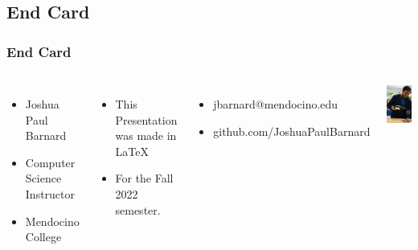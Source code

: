 \documentclass{beamer}
\begin{document}
		\subsection{End Card}
	\begin{frame}
		\frametitle{End Card}	
		\begin{columns}
			\vspace{-25pt}
			\begin{itemize}
				\item Joshua Paul Barnard
				\item Computer Science Instructor
				\item Mendocino College
			\end{itemize}
			\begin{itemize}
				\item This Presentation was made in \LaTeX
				\item For the Fall 2022 semester.  
			\end{itemize}
			\begin{itemize}
				\item jbarnard@mendocino.edu
				\item github.com/JoshuaPaulBarnard
			\end{itemize}
			\includegraphics[width=.85\textwidth]{images/shone farm wine pouring - vert.png}
		\end{columns}
	\end{frame}
	
\end{document}
